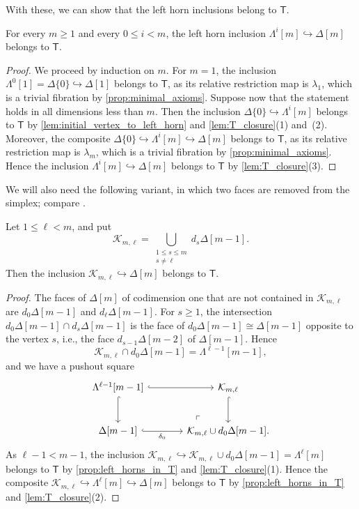 \documentclass[10pt,reqno]{amsart}
\begin{document}
With these, we can show that the left horn inclusions belong to
$\mathsf T$.

\begin{proposition}
\label{prop:left_horns_in_T}
For every $m\geq1$ and every $0\leq i<m$, the left horn inclusion
$\Lambda^i[m]\hookrightarrow\Delta[m]$
belongs to $\mathsf T$.
\end{proposition}

\begin{proof}
We proceed by induction on $m$. For $m=1$, the inclusion
$\Lambda^0[1]=\Delta\{0\}\hookrightarrow\Delta[1]$ belongs to
$\mathsf T$, as its relative restriction map is $\lambda_1$, which
is a trivial fibration by \cref{prop:minimal_axioms}. Suppose now that
the statement holds in all dimensions less than $m$. Then the
inclusion $\Delta\{0\}\hookrightarrow\Lambda^i[m]$ belongs to
$\mathsf T$ by \cref{lem:initial_vertex_to_left_horn} and
\cref{lem:T_closure}(1) and~(2). Moreover, the composite
$\Delta\{0\}\hookrightarrow\Lambda^i[m]\hookrightarrow\Delta[m]$
belongs to $\mathsf T$, as its relative restriction map is
$\lambda_m$, which is a trivial fibration by
\cref{prop:minimal_axioms}. Hence the inclusion
$\Lambda^i[m]\hookrightarrow\Delta[m]$ belongs to $\mathsf T$ by
\cref{lem:T_closure}(3).
\end{proof}

We will also need the following variant, in which two faces are
removed from the simplex; compare
\cite[Proposition~2.12\textup{(ii)}]{Joyal2008Theory}.

\begin{lemma}
\label{lem:two_missing_horizontal_faces}
Let $1\leq\ell<m$, and put
\[
\mathcal K_{m,\ell}
=
\bigcup_{\substack{1\leq s\leq m\\s\neq\ell}}
d_s\Delta[m-1].
\]
Then the inclusion
$\mathcal K_{m,\ell}\hookrightarrow\Delta[m]$
belongs to $\mathsf T$.
\end{lemma}

\begin{proof}
The faces of $\Delta[m]$ of codimension one that are not contained
in $\mathcal K_{m,\ell}$ are $d_0\Delta[m-1]$ and
$d_\ell\Delta[m-1]$. For $s\geq1$, the intersection
$d_0\Delta[m-1]\cap d_s\Delta[m-1]$ is the face of
$d_0\Delta[m-1]\cong\Delta[m-1]$ opposite to the vertex $s$, i.e.,
the face $d_{s-1}\Delta[m-2]$ of $\Delta[m-1]$. Hence
\[
\mathcal K_{m,\ell}\cap d_0\Delta[m-1]
  =
\Lambda^{\ell-1}[m-1],
\]
and we have a pushout square
\[
\begin{tikzcd}[ampersand replacement=\&, sep=large]
\Lambda^{\ell-1}[m-1]\arrow[r,hook]\arrow[d,hook]
\&\mathcal K_{m,\ell}\arrow[d,hook]\\
\Delta[m-1]\arrow[r,hook,"\delta_0"']
\&\mathcal K_{m,\ell}\cup d_0\Delta[m-1]
  \arrow[ul,phantom,"\ulcorner",very near start].
\end{tikzcd}
\]
As $\ell-1<m-1$, the inclusion
$\mathcal K_{m,\ell}\hookrightarrow
\mathcal K_{m,\ell}\cup d_0\Delta[m-1]=\Lambda^\ell[m]$ belongs to
$\mathsf T$ by \cref{prop:left_horns_in_T} and
\cref{lem:T_closure}(1). Hence the composite
$\mathcal K_{m,\ell}\hookrightarrow\Lambda^\ell[m]
\hookrightarrow\Delta[m]$ belongs to $\mathsf T$ by
\cref{prop:left_horns_in_T} and \cref{lem:T_closure}(2).
\end{proof}
\end{document}
